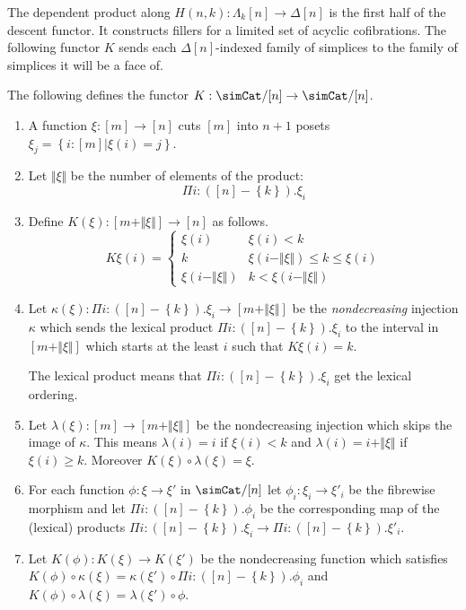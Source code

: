 \documentclass{tac}
\newcommand\cat\mathcal
\newcommand\set[1]{\left\{#1\right\}}
\newcommand\dual{^{\mathrm{op}}}
\newcommand\s{^{\simCat\dual}}
\newcommand\of{:}
\newcommand\simplex\Delta
\newcommand\horn\Lambda
\newcommand\norm[1]{\Vert #1 \Vert}
\newcommand\ka\kappa
\newcommand\la\lambda
\begin{document}

The dependent product along $H(n,k)\of \horn_k[n]\to\simplex[n]$ is the first half of the descent functor. It constructs fillers for a limited set of acyclic cofibrations. The following functor $K$ sends each $\simplex[n]$-indexed family of simplices to the family of simplices it will be a face of.

\begin{definition}
The following defines the functor $K\of\simCat/[n]\to\simCat/[n]$.
\begin{enumerate}
\item A function $\xi\of[m]\to[n]$ cuts $[m]$ into $n+1$ posets $\xi_j = \set{i\of[m]|\xi(i)=j}$. 
\item Let $\norm \xi$ be the number of elements of the product: \[\Pi i\of ([n]-\set k).\xi_i\] 
\item Define $K(\xi)\of [m+\norm\xi]\to [n]$ as follows.
\[ 
	K\xi(i) = \left\{
		\begin{array}{cc}
			\xi(i) & \xi(i)<k \\
			k & \xi(i-\norm\xi)\leq k \leq \xi(i)\\
			\xi(i-\norm\xi) & k<\xi(i-\norm\xi)
		\end{array}
	\right.
\]
\item Let $\ka(\xi)\of\Pi i\of([n]-\set k).\xi_i \to [m+\norm\xi]$ be the \emph{nondecreasing} injection $\ka$ which sends the lexical product $\Pi i\of([n]-\set k).\xi_i$ to the interval in $[m+\norm\xi]$ which starts at the least $i$ such that $K\xi(i)=k$.

The lexical product means that $\Pi i\of([n]-\set k).\xi_i$ get the lexical ordering. %

\item Let $\la(\xi)\of[m]\to[m+\norm\xi]$ be the nondecreasing injection which skips the image of $\ka$. This means $\la(i)=i$ if $\xi(i)<k$ and $\la(i)=i+\norm\xi$ if $\xi(i)\geq k$. Moreover $K(\xi)\circ\la(\xi) = \xi$.
\item For each function $\phi\of\xi\to\xi'$ in $\simCat/[n]$ let $\phi_i\of\xi_i\to\xi'_i$ be the fibrewise morphism and let $\Pi i\of([n]-\set k).\phi_i$ be the corresponding map of the (lexical) products $\Pi i\of([n]-\set k).\xi_i\to\Pi i\of([n]-\set k).\xi'_i$.
\item Let $K(\phi)\of K(\xi)\to K(\xi')$ be the nondecreasing function which satisfies $K(\phi)\circ \ka(\xi) = \ka(\xi')\circ \Pi i\of([n]-\set k).\phi_i$ and $K(\phi)\circ \la(\xi) = \la(\xi')\circ \phi$.
\end{enumerate}
\end{definition}
\end{document}
